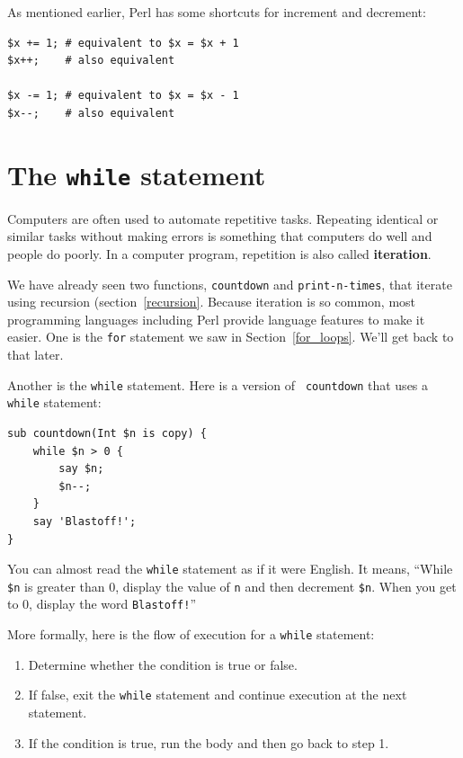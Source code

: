 As mentioned earlier, Perl has some shortcuts for increment and decrement:

\begin{verbatim}
$x += 1; # equivalent to $x = $x + 1
$x++;    # also equivalent 

$x -= 1; # equivalent to $x = $x - 1
$x--;    # also equivalent 
\end{verbatim}

\section{The {\tt while} statement}

Computers are often used to automate repetitive tasks.  Repeating
identical or similar tasks without making errors is something that
computers do well and people do poorly.  In a computer program,
repetition is also called {\bf iteration}.

We have already seen two functions, {\tt countdown} and
\verb"print-n-times", that iterate using recursion 
(section~\ref{recursion}.  Because 
iteration is so common, most programming languages including 
Perl provide language features to make it easier.
One is the {\tt for} statement we saw in Section~\ref{for_loops}.
We'll get back to that later.

Another is the {\tt while} statement.  Here is a version of {\tt
countdown} that uses a {\tt while} statement:

\begin{verbatim}
sub countdown(Int $n is copy) {
    while $n > 0 {
        say $n;
        $n--;
    }
    say 'Blastoff!';
}
\end{verbatim}
%
You can almost read the {\tt while} statement as if it were English.
It means, ``While {\tt \$n} is greater than 0,
display the value of {\tt n} and then decrement
{\tt \$n}.  When you get to 0, display the word {\tt Blastoff!}''

More formally, here is the flow of execution for a {\tt while} statement:

\begin{enumerate}

\item Determine whether the condition is true or false.

\item If false, exit the {\tt while} statement
and continue execution at the next statement.

\item If the condition is true, run the
body and then go back to step 1.

\end{enumerate}

